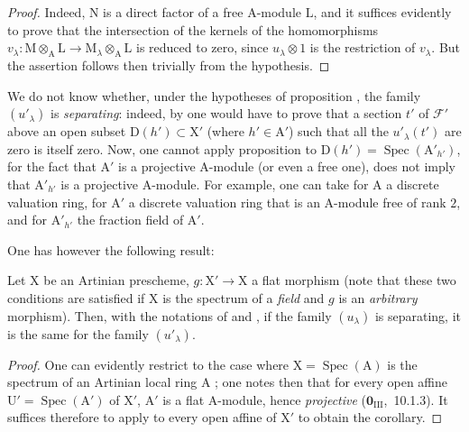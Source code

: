 \begin{proof}
Indeed, $\mathrm{N}$ is a direct factor of a free $\mathrm{A}$-module $\mathrm{L}$, and it suffices evidently to prove that the intersection of the kernels of the homomorphisms $v_\lambda:\mathrm{M}\otimes_\mathrm{A}\mathrm{L}\to\mathrm{M}_\lambda\otimes_\mathrm{A}\mathrm{L}$ is reduced to zero, since $u_\lambda\otimes 1$ is the restriction of $v_\lambda$.
But the assertion follows then trivially from the hypothesis.
\end{proof}

\begin{remarks}[11.9.8]
\label{IV.11.9.8}
We do not know whether, under the hypotheses of proposition , the family $(u'_\lambda)$ is \emph{separating}: indeed, by  one would have to prove that a section $t'$ of $\mathscr{F}'$ above an open subset $\mathrm{D}(h')\subset\mathrm{X}'$ (where $h'\in\mathrm{A}'$) such that all the $u'_\lambda(t')$ are zero is itself zero.
Now, one cannot apply proposition  to $\mathrm{D}(h')=\operatorname{Spec}(\mathrm{A}'_{h'})$, for the fact that $\mathrm{A}'$ is a projective $\mathrm{A}$-module (or even a free one), does not imply that $\mathrm{A}'_{h'}$ is a projective $\mathrm{A}$-module.
For example, one can take for $\mathrm{A}$ a discrete valuation ring, for $\mathrm{A}'$ a discrete valuation ring that is an $\mathrm{A}$-module free of rank $2$, and for $\mathrm{A}'_{h'}$ the fraction field of $\mathrm{A}'$.
\end{remarks}

One has however the following result:

\begin{corollary}[11.9.9]
\label{IV.11.9.9}
Let $\mathrm{X}$ be an \textup{Artinian} prescheme, $g:\mathrm{X}'\to\mathrm{X}$ a \textup{flat} morphism \textup{(note that these two conditions are satisfied if $\mathrm{X}$ is the spectrum of a \emph{field} and $g$ is an \emph{arbitrary} morphism)}.
Then, with the notations of  and , if the family $(u_\lambda)$ is separating, it is the same for the family $(u'_\lambda)$.
\end{corollary}

\begin{proof}
One can evidently restrict to the case where $\mathrm{X}=\operatorname{Spec}(\mathrm{A})$ is the spectrum of an Artinian local ring $\mathrm{A}$ ; one notes then that for every open affine $\mathrm{U}'=\operatorname{Spec}(\mathrm{A}')$ of $\mathrm{X}'$, $\mathrm{A}'$ is a flat $\mathrm{A}$-module, hence \emph{projective} ($\mathbf{0}_{\mathrm{III}}$,~10.1.3).
It suffices therefore to apply  to every open affine of $\mathrm{X}'$ to obtain the corollary.
\end{proof}


